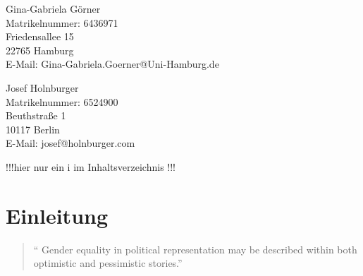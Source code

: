 \documentclass[12pt, 
    twoside=false, 
    bibliography=totoc, 
    numbers=endperiod, 
    headings=normal, 
    toc=chapterentrydotfill
    ]{scrbook}
\begin{document}
\begin{titlepage}
	\begin{minipage}[t]{0.48\textwidth}
    \flushleft 
    Gina-Gabriela Görner \\
    Matrikelnummer: 6436971 \\
    Friedensallee 15 \vspace{0.1cm} \\ 
	22765 Hamburg \vspace{0.1cm}  \\
	E-Mail: Gina-Gabriela.Goerner@Uni-Hamburg.de \\ 
    \end{minipage}
    \begin{minipage}[t]{0.48\textwidth}
	\flushleft
	Josef Holnburger \\
	Matrikelnummer: 6524900 \\
	Beuthstraße 1 \vspace{0.1cm} \\
	10117 Berlin \vspace{0.1cm} \\
	E-Mail: josef@holnburger.com \\
    \end{minipage}

\end{titlepage}

\frontmatter

\tableofcontents

\listoffigures
{} !!!hier nur ein i im Inhaltsverzeichnis !!!
\vspace*{24pt}
{\let\clearpage\relax \listoftables}	

\mainmatter



\chapter{Einleitung}\label{Einleitung} 

\begin{quote}
    \enquote{ Gender equality in political representation may be described within both optimistic and pessimistic stories.} \parencite[149]{celis_2018}
\end{quote}
\end{document}
